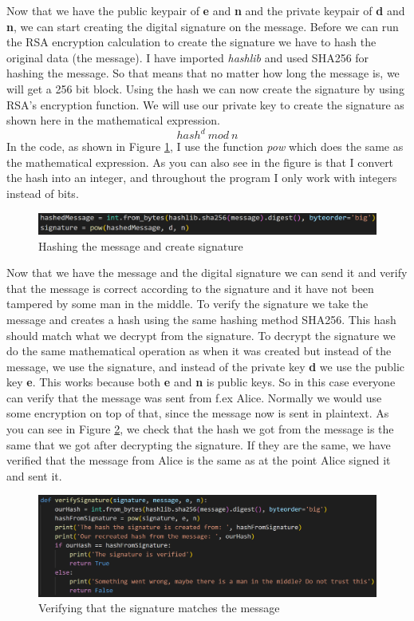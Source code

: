 \documentclass[12pt, letterpaper]{article}
\begin{document}
Now that we have the public keypair of \textbf{e} and \textbf{n} and the private keypair of \textbf{d} and \textbf{n}, we can start creating the digital signature on the message. Before we can run the RSA encryption calculation to create the signature we have to hash the original data (the message). I have imported \textit{hashlib} and used SHA256 for hashing the message. So that means that no matter how long the message is, we will get a 256 bit block.
Using the hash we can now create the signature by using RSA's encryption function. We will use our private key to create the signature as shown here in the mathematical expression.
$$hash^{d}\ mod\ n$$
In the code, as shown in Figure \ref{fig:hash}, I use the function \textit{pow} which does the same as the mathematical expression. As you can also see in the figure is that I convert the hash into an integer, and throughout the program I only work with integers instead of bits.

\begin{figure}[H]
  \includegraphics[width=\linewidth]{code_snippets/hash.PNG}\centering
  \caption{Hashing the message and create signature}
  \label{fig:hash}
\end{figure}

Now that we have the message and the digital signature we can send it and verify that the message is correct according to the signature and it have not been tampered by some man in the middle. To verify the signature we take the message and creates a hash using the same hashing method SHA256. This hash should match what we decrypt from the signature. To decrypt the signature we do the same mathematical operation as when it was created but instead of the message, we use the signature, and instead of the private key \textbf{d} we use the public key \textbf{e}. This works because both \textbf{e} and \textbf{n} is public keys. So in this case everyone can verify that the message was sent from f.ex Alice. Normally we would use some encryption on top of that, since the message now is sent in plaintext. As you can see in Figure \ref{fig:verify}, we check that the hash we got from the message is the same that we got after decrypting the signature. If they are the same, we have verified that the message from Alice is the same as at the point Alice signed it and sent it.

\begin{figure}[H]
  \includegraphics[width=\linewidth]{code_snippets/verify.PNG}\centering
  \caption{Verifying that the signature matches the message}
  \label{fig:verify}
\end{figure}
\end{document}
